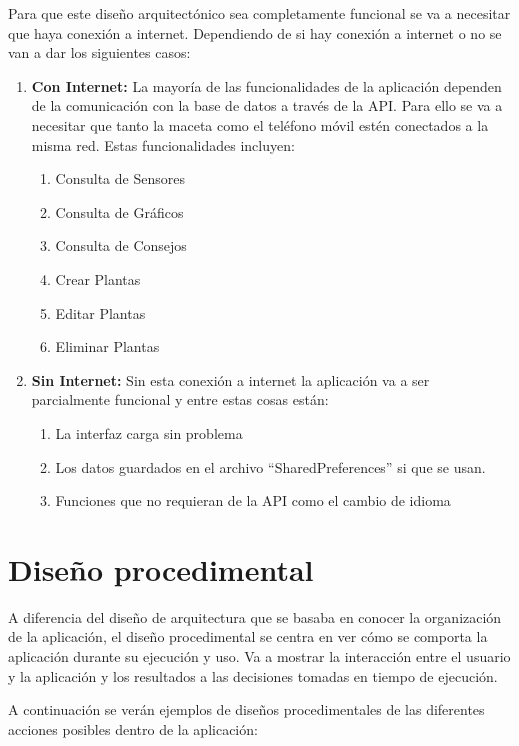 Para que este diseño arquitectónico sea completamente funcional se va a necesitar que haya conexión a internet. Dependiendo de si hay conexión a internet o no se van a dar los siguientes casos:
\begin{enumerate}
    \item \textbf{Con Internet:}
    La mayoría de las funcionalidades de la aplicación dependen de la comunicación con la base de datos a través de la API. Para ello se va a necesitar que tanto la maceta como el teléfono móvil estén conectados a la misma red. Estas funcionalidades incluyen:
    \begin{enumerate}
        \item {Consulta de Sensores}
        \item {Consulta de Gráficos}
        \item {Consulta de Consejos}
        \item {Crear Plantas}
        \item {Editar Plantas}
        \item {Eliminar Plantas}
    \end{enumerate}
    \item \textbf{Sin Internet:}
    Sin esta conexión a internet la aplicación va a ser parcialmente funcional y entre estas cosas están:
    \begin{enumerate}
        \item {La interfaz carga sin problema}
        \item {Los datos guardados en el archivo ``SharedPreferences'' si que se usan.}
        \item {Funciones que no requieran de la API como el cambio de idioma}
    \end{enumerate}
\end{enumerate}


\section{Diseño procedimental}
A diferencia del diseño de arquitectura que se basaba en conocer la organización de la aplicación, el diseño procedimental se centra en ver cómo se comporta la aplicación durante su ejecución y uso. Va a mostrar la interacción entre el usuario y la aplicación y los resultados a las decisiones tomadas en tiempo de ejecución.

A continuación se verán ejemplos de diseños procedimentales de las diferentes acciones posibles dentro de la aplicación:


